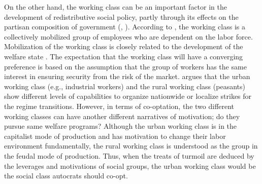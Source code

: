 \documentclass[12pt, letterpage, notitlepage]{article}
\begin{document}
On the other hand, the working class can be an important factor in the development of redistributive social policy, partly through its effects on the partisan composition of government (\citealp{HuberStephens2001}, \citealp[794]{Rasmussen2018}). According to \citet[175]{Korpi2006}, the working class is a collectively mobilized group of employees who are dependent on the labor force. Mobilization of the working class is closely related to the development of the welfare state \citep{Shalev1983}. The expectation that the working class will have a converging preference is based on the assumption that the group of workers has the same interest in ensuring security from the risk of the market. \citet[1495]{Dahlum2019} argues that the urban working class (e.g., industrial workers) and the rural working class (peasants) show different levels of capabilities to organize nationwide or localize strikes for the regime transitions. However, in terms of co-optation, the two different working classes can have another different narratives of motivation; do they pursue same welfare programs? Although the urban working class is in the capitalist mode of production and has motivation to change their labor environment fundamentally, the rural working class is understood as the group in the feudal mode of production. Thus, when the treats of turmoil are deduced by the leverages and motivations of social groups, the urban working class would be the social class autocrats should co-opt.


\end{document}
